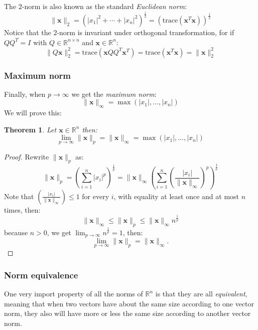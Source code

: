 \documentclass[a4paper,11pt]{report}
\newtheorem{theorem}{Theorem}[section]
\newcommand{\R}{{\mathbb R}}
\begin{document}
The $2$-norm is also known as the standard \emph{Euclidean norm}:
$$\|\mathbf{x}\|_2 = (|x_1|^2+  \cdots + |x_n|^2)^{\frac{1}{2}} = (\text{trace}(\mathbf{x}^T \mathbf{x}))^{\frac{1}{2}}$$
Notice that the $2$-norm is invariant under orthogonal transformation, for if 
$QQ^T = I$ with $Q \in \R^{n\times n}$ and $\mathbf{x} \in \R^n$:
$$\|Q\mathbf{x}\|^2_2 = \text{trace}(\mathbf{x}QQ^T\mathbf{x}^T) = \text{trace}(\mathbf{x}^T\mathbf{x}) = 
\|\mathbf{x}\|^2_2$$

\subsubsection{Maximum norm}
Finally, when $p \to \infty$ we get the \emph{maximum norm}:
$$\|\mathbf{x}\|_\infty = \max(|x_1|, \ldots, |x_n|)$$ 
We will prove this:
\begin{theorem}
  Let $\mathbf{x} \in \R^n$ then:
  $$\lim_{p\to \infty}\|\mathbf{x}\|_p = \|\mathbf{x}\|_\infty =\max(|x_1|, \ldots, |x_n|)$$
\end{theorem}
\begin{proof}
  Rewrite $\|\mathbf{x}\|_p$ as: 
  $$\|\mathbf{x}\|_p = \left(\sum^n_{i=1} |x_i|^p \right)^{\frac{1}{p}} = \|\mathbf{x}\|_\infty 
  \left(\sum^n_{i=1} \left(\frac{|x_i|}{\|\mathbf{x}\|_\infty} \right)^p \right)^{\frac{1}{p}}$$
  Note that $\left(\frac{|x_i|}{\|\mathbf{x}\|_\infty}\right) \leq 1$ for every $i$, with equality at least once and
  at most $n$ times, then:
  $$\|\mathbf{x}\|_\infty \leq \|\mathbf{x}\|_p \leq \|\mathbf{x}\|_\infty n^{\frac{1}{p}}$$ 
  because $n > 0$, we get $\lim_{p\to \infty} n^{\frac{1}{p}} = 1$, then:
  $$\lim_{p\to\infty} \|\mathbf{x}\|_p = \|\mathbf{x}\|_\infty.$$
\end{proof}

\subsubsection{Norm equivalence}

One very import property of all the norms of $\R^n$ is that they are all 
\emph{equivalent}, meaning that when two vectors have about the same size according to one vector norm, they also
will have more or less the same size according to another vector norm. 
\end{document}
